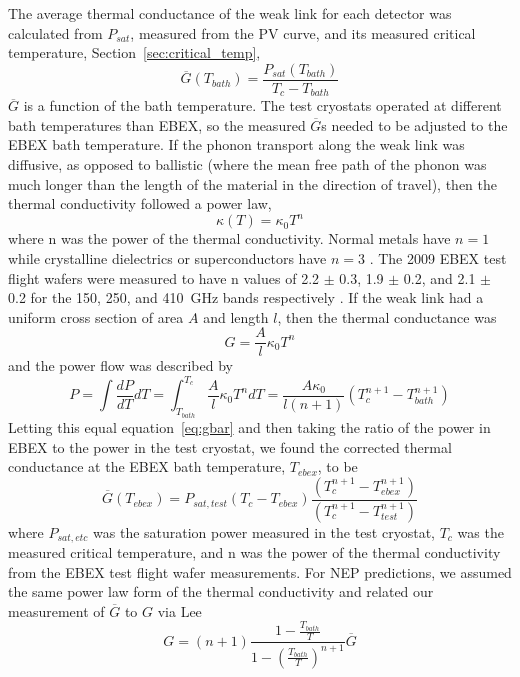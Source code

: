 The average thermal conductance of the weak link for each detector was calculated from $P_{sat}$, measured from the PV curve, and its measured critical temperature, Section~\ref{sec:critical_temp}, 
\begin{equation}
\overline{G}(T_{bath}) = \frac{P_{sat}(T_{bath})}{T_{c} - T_{bath}}
\end{equation}
$\overline{G}$ is a function of the bath temperature. 
The test cryostats operated at different bath temperatures than \ac{EBEX}, so the measured $\overline{G}$s needed to be adjusted to the \ac{EBEX} bath temperature. 
If the phonon transport along the weak link was diffusive, as opposed to ballistic (where the mean free path of the phonon was much longer than the length of the material in the direction of travel), then the thermal conductivity followed a power law, 
\begin{equation}
\kappa \left( T \right) = \kappa_0 T^n
\end{equation}
where n was the power of the thermal conductivity. 
Normal metals have $n=1$ while crystalline dielectrics or superconductors have $n=3$ \cite{Mather1982}. 
The 2009 \ac{EBEX} test flight wafers were measured to have n values of 2.2 $\pm$ 0.3, 1.9 $\pm$ 0.2, and 2.1 $\pm$ 0.2 for the 150, 250, and 410~GHz bands respectively \cite{Hubmayr2009}.
If the weak link had a uniform cross section of area $A$ and length $l$, then the thermal conductance was 
\begin{equation}
G = \frac{A}{l} \kappa_0 T^n
\end{equation}
and the power flow was described by
\begin{equation}
P = \int \frac{dP}{dT} dT = \int_{T_{bath}}^{T_c} \frac{A}{l} \kappa_0 T^n dT = \frac{A\kappa_0}{l(n+1)} \left( T_c^{n+1} - T_{bath}^{n+1} \right)
\label{eq:power_int}
\end{equation}
Letting this equal equation~\ref{eq:gbar} and then taking the ratio of the power in \ac{EBEX} to the power in the test cryostat, we found the corrected thermal conductance at the \ac{EBEX} bath temperature, $T_{ebex}$, to be
\begin{equation}
\overline{G} \left( T_{ebex} \right) = P_{sat, test} \left( T_c - T_{ebex} \right) \frac{\left( T_c^{n+1} - T_{ebex}^{n+1} \right)}{\left( T_c^{n+1} - T_{test}^{n+1} \right)}
\end{equation}
where $P_{sat,etc}$ was the saturation power measured in the test cryostat, $T_c$ was the measured critical temperature, and n was the power of the thermal conductivity from the \ac{EBEX} test flight wafer measurements. 
For \ac{NEP} predictions, we assumed the same power law form of the thermal conductivity and related our measurement of $\overline G$ to $G$ via Lee \cite{Lee1998}
\begin{equation}
G = (n + 1) \frac{1-\frac{T_{bath}}{T}}{1-\left(\frac{T_{bath}}{T}\right)^{n+1}} \overline{G}
\label{eq:gbar_to_g}
\end{equation}


